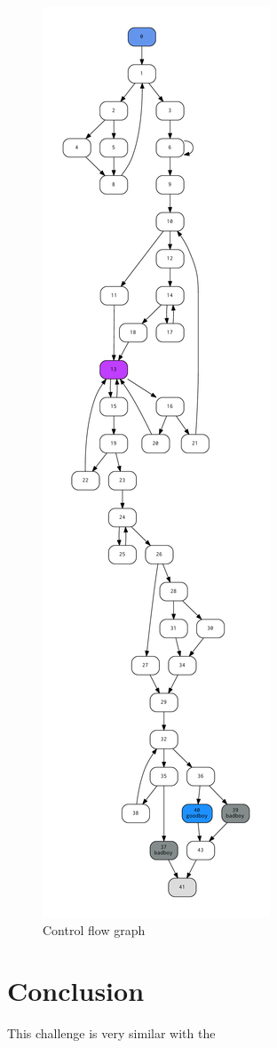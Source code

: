 \documentclass{easychair}
\begin{document}
\begin{figure}[ht]
  \centering
  \includegraphics[height=1\textheight,keepaspectratio]{panda_cfg.pdf}
  \caption{Control flow graph}\label{fig:cfg}
\end{figure}

\section{Conclusion}
This challenge is very similar with the 


\printbibliography
\end{document}

